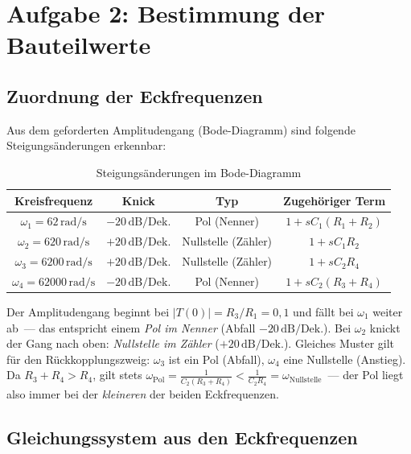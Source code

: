 \documentclass[12pt,a4paper]{article}
\begin{document}
\section{Aufgabe 2: Bestimmung der Bauteilwerte}

\subsection{Zuordnung der Eckfrequenzen}

Aus dem geforderten Amplitudengang (Bode-Diagramm) sind folgende Steigungsänderungen
erkennbar:

\begin{table}[H]
  \centering
  \caption{Steigungsänderungen im Bode-Diagramm}
  \begin{tabular}{cccc}
    \toprule
    Kreisfrequenz & Knick & Typ & Zugehöriger Term \\
    \midrule
    $\omega_1 = 62\,\text{rad/s}$    & $-20\,\text{dB/Dek.}$ & Pol (Nenner)      & $1 + sC_1(R_1+R_2)$ \\
    $\omega_2 = 620\,\text{rad/s}$   & $+20\,\text{dB/Dek.}$ & Nullstelle (Zähler) & $1 + sC_1 R_2$ \\
    $\omega_3 = 6200\,\text{rad/s}$  & $+20\,\text{dB/Dek.}$ & Nullstelle (Zähler) & $1 + sC_2 R_4$ \\
    $\omega_4 = 62000\,\text{rad/s}$ & $-20\,\text{dB/Dek.}$ & Pol (Nenner)      & $1 + sC_2(R_3+R_4)$ \\
    \bottomrule
  \end{tabular}
\end{table}

\begin{tcolorbox}[hinweis, title=Hinweis zur Zuordnung]
Der Amplitudengang beginnt bei $|T(0)| = R_3/R_1 = 0{,}1$ und fällt bei $\omega_1$
weiter ab~--- das entspricht einem \emph{Pol im Nenner} (Abfall $-20\,\text{dB/Dek.}$).
Bei $\omega_2$ knickt der Gang nach oben: \emph{Nullstelle im Zähler} ($+20\,\text{dB/Dek.}$).
Gleiches Muster gilt für den Rückkopplungszweig: $\omega_3$ ist ein Pol (Abfall),
$\omega_4$ eine Nullstelle (Anstieg). Da $R_3+R_4 > R_4$, gilt stets
$\omega_{\text{Pol}} = \frac{1}{C_2(R_3+R_4)} < \frac{1}{C_2 R_4} = \omega_{\text{Nullstelle}}$~---
der Pol liegt also immer bei der \emph{kleineren} der beiden Eckfrequenzen.
\end{tcolorbox}

\subsection{Gleichungssystem aus den Eckfrequenzen}
\end{document}
